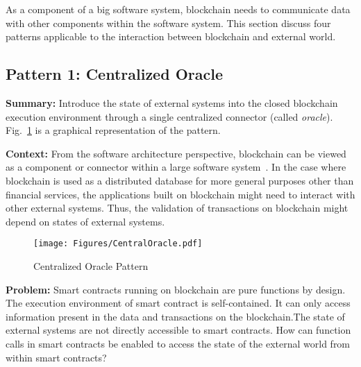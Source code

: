 As a component of a big software system, blockchain needs to communicate data with other components within the software system. This section discuss four patterns applicable to the interaction between blockchain and external world.


\subsection{\textbf{Pattern 1: Centralized Oracle}}
\label{sec:centralOracle}

\noindent \textbf{Summary:} Introduce the state of external systems into the closed blockchain execution environment through a single centralized connector (called \textit{oracle}). Fig.~\ref{fig:centralOracle} is a graphical representation of the pattern.

\vspace{0.5em}\noindent \textbf{Context:} 
From the software architecture perspective, blockchain can be viewed as a component or connector within a large software system~\cite{sherry2016}. In the case where blockchain is used as a distributed database for more general purposes other than financial services, the applications built on blockchain might need to interact with other external systems. Thus, the validation of transactions on blockchain might depend on states of external systems. 

\begin{figure}[t]
\begin{center}
\texttt{[image: Figures/CentralOracle.pdf]}
\caption{Centralized Oracle Pattern}\label{fig:centralOracle}
\end{center}
\end{figure}

\vspace{0.5em}\noindent \textbf{Problem:} 
Smart contracts running on blockchain are pure functions by design. The execution environment of smart contract is self-contained. It can only access information present in the data and transactions on the blockchain.The state of external systems are not directly accessible to smart contracts. %
How can function calls in smart contracts be enabled to access the state of the external world from within smart contracts? 


